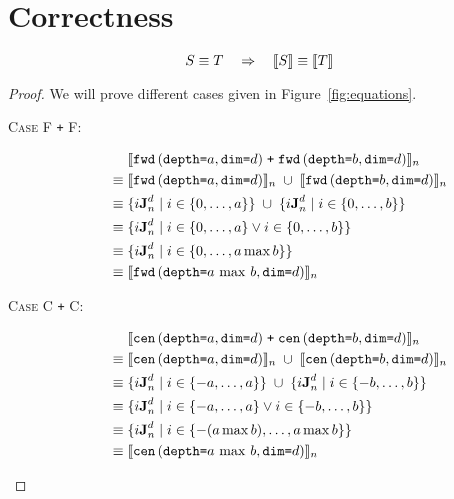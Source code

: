 \section{Correctness}


\begin{theorem}[Soundness]
\[
S \equiv T
\quad
\Rightarrow
\quad
\interp{S} \equiv \interp{T}
\]
\end{theorem}

\begin{proof}
We will prove different cases given in Figure~\ref{fig:equations}.

\begin{description}
  \item[\textsc{Case F \texttt{+} F}:]
    \begin{align*}
      & \; \interp{\stenFwdS{a}{d} \; \texttt{+} \; \stenFwdS{b}{d}}_{n} \\
      \equiv & \; \interp{\stenFwdS{a}{d}}_{n} \; \cup \; \interp{\stenFwdS{b}{d}}_{n} \\
      \equiv & \; \{i\singleEntry{d}{n} \mid i \in \{0, \ldots, a\} \} \; \cup \;
                  \{i\singleEntry{d}{n} \mid i \in \{0, \ldots, b\} \} \\
      \equiv & \; \{i\singleEntry{d}{n} \mid i \in \{0, \ldots, a\}
                    \vee i \in \{0, \ldots, b\} \} \\
      \equiv & \; \{i\singleEntry{d}{n} \mid i \in \{0, \ldots, a \max b\} \} \\
      \equiv & \; \interp{\stenFwdS{a \, \max \, b}{d}}_n \\
    \end{align*}
  \item[\textsc{Case C \texttt{+} C}:]
    \begin{align*}
      & \; \interp{\stenCenS{a}{d} \; \texttt{+} \; \stenCenS{b}{d}}_{n} \\
      \equiv & \; \interp{\stenCenS{a}{d}}_{n} \; \cup \; \interp{\stenCenS{b}{d}}_{n} \\
      \equiv & \; \{i\singleEntry{d}{n} \mid i \in \{-a, \ldots, a\} \} \; \cup \;
                  \{i\singleEntry{d}{n} \mid i \in \{-b, \ldots, b\} \} \\
      \equiv & \; \{i\singleEntry{d}{n} \mid i \in \{-a, \ldots, a\}
                    \vee i \in \{-b, \ldots, b\} \} \\
      \equiv & \; \{i\singleEntry{d}{n} \mid i \in \{- (a \max b), \ldots, a \max b\} \} \\
      \equiv & \; \interp{\stenCenS{a \, \max \, b}{d}}_n \\

\end{align*}
\end{description}
\end{proof}
